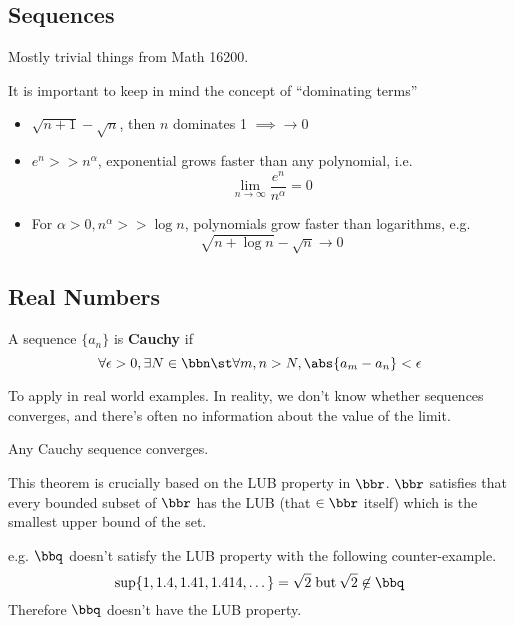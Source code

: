 
\subsection{Sequences}
Mostly trivial things from Math 16200.

It is important to keep in mind the concept of ``dominating terms''
\begin{itemize}
    \item \(\sqrt{n+1} -\sqrt{n}\), then \(n\) dominates 1 \(\implies \rightarrow 0\)
    \item \(e^n >> n^\alpha\), exponential grows faster than any polynomial, i.e. \[
              \lim_{n\to\infty} \dfrac{e^n}{n^\alpha} = 0
          \]
    \item For \(\alpha > 0, n^\alpha >> \log n\), polynomials grow faster than logarithms, e.g. \[
              \sqrt{n + \log n} - \sqrt{n} \rightarrow 0
          \]
\end{itemize}

\subsection{Real Numbers}
\begin{definition} 
    A sequence \(\{a_n\}\) is \textbf{Cauchy} if \[
        \forall \epsilon > 0, \exists N \in \bbn \st \forall m, n > N, \abs{a_m - a_n} < \epsilon
    \]
\end{definition}

\begin{motivation}
    To apply in real world examples. In reality, we don't know whether sequences converges, and there's often no information about the value of the limit.
\end{motivation}

\begin{theorem} 
    Any Cauchy sequence converges.
\end{theorem}

\begin{remark}
    This theorem is crucially based on the LUB property in \(\bbr\). \(\bbr\) satisfies that every bounded subset of \(\bbr\) has the LUB (that \(\in \bbr\) itself) which is the smallest upper bound of the set.

    e.g. \(\bbq\) doesn't satisfy the LUB property with the following counter-example. \[
        \sup\{1, 1.4, 1.41, 1.414, \dots\} = \sqrt{2} \;\text{but}\: \sqrt{2} \not \in \bbq
    \]
    Therefore \(\bbq\) doesn't have the LUB property.
\end{remark}

